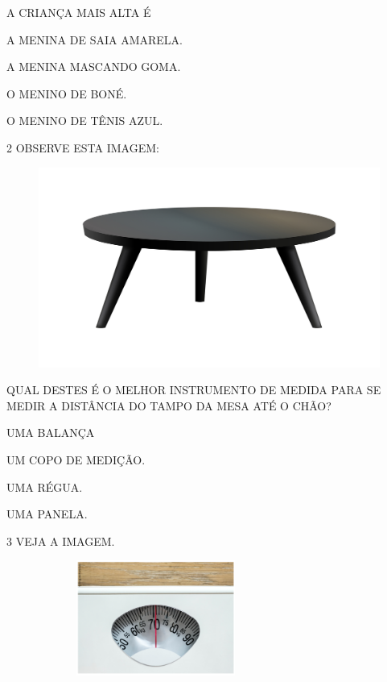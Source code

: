 A CRIANÇA MAIS ALTA É

\begin{escolha}
\item A MENINA DE SAIA AMARELA.

\item A MENINA MASCANDO GOMA.

\item O MENINO DE BONÉ.

\item O MENINO DE TÊNIS AZUL.
\end{escolha}

\pagebreak
\num{2} OBSERVE ESTA IMAGEM:

\begin{figure}[htpb!]
\centering
\includegraphics[width=.4\textwidth]{media/image32b.jpg}
\end{figure}

QUAL DESTES É O MELHOR INSTRUMENTO DE MEDIDA PARA SE MEDIR A DISTÂNCIA DO TAMPO DA MESA ATÉ O CHÃO?

\begin{escolha}
\item UMA BALANÇA

\item UM COPO DE MEDIÇÃO.

\item UMA RÉGUA.

\item UMA PANELA.
\end{escolha}

\num{3} VEJA A IMAGEM.


\begin{figure}[htpb!]
\centering
\includegraphics[width=3.03770in,height=1.48580in]{../ilustracoes/MAT1/SAEB_1ANO_MAT_FIGURA44.png}
\end{figure}


